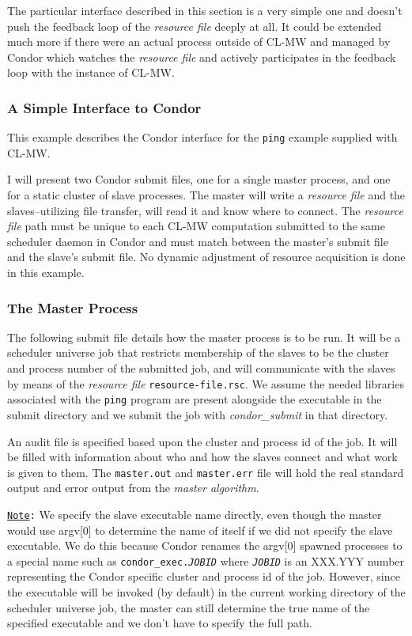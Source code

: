 \documentclass[titlepage,12pt]{book}
\newcommand{\xsmall}{\latexhtml{\small}{}}
\newcommand{\xnormalsize}{\latexhtml{\normalsize}{}}
\newcommand{\clmw}{\xsmall\textsc{CL-MW}\xnormalsize\xspace}
\newcommand{\ma}{\textit{master algorithm}\xspace}
\newcommand{\rfile}{\textit{resource file}\xspace}
\newcommand{\file}[1]{\texttt{#1}\xspace}
\newcommand{\Note}{\texttt{\underline{Note}:}\xspace}
\begin{document}
The particular interface described in this section is a very simple one
and doesn't push the feedback loop of the \rfile deeply at all. It
could be extended much more if there were an actual process outside
of \clmw and managed by Condor which watches the \rfile and actively
participates in the feedback loop with the instance of \clmw.

\subsubsection{A Simple Interface to Condor}

This example describes the Condor interface for the \texttt{ping}
example supplied with \clmw.

I will present two Condor submit files, one for a single master
process, and one for a static cluster of slave processes. The master
will write a \rfile and the slaves--utilizing file transfer, will
read it and know where to connect. The \rfile path must be unique
to each \clmw computation submitted to the same scheduler daemon
in Condor and must match between the master's submit file and the
slave's submit file. No dynamic adjustment of resource acquisition is
done in this example.

\subsubsection{The Master Process}

The following submit file details how the master process is to be run.
It will be a scheduler universe job that restricts membership of
the slaves to be the cluster and process number of the submitted
job, and will communicate with the slaves by means of the \rfile
\file{resource-file.rsc}. We assume the needed libraries associated
with the \texttt{ping} program are present alongside the executable in
the submit directory and we submit the job with \textit{condor\_submit}
in that directory.

An audit file is specified based upon the cluster and process id of
the job.  It will be filled with information about who and how the
slaves connect and what work is given to them. The \file{master.out}
and \file{master.err} file will hold the real standard output and
error output from the \ma.

\Note We specify the slave executable name directly, even though
the master would use argv[0] to determine the name of itself if we
did not specify the slave executable. We do this because Condor
renames the argv[0] spawned processes to a special name such as
\texttt{condor\_exec.\textit{JOBID}} where \texttt{\textit{JOBID}} is
an XXX.YYY number representing the Condor specific cluster and process
id of the job.  However, since the executable will be invoked (by
default) in the current working directory of the scheduler universe
job, the master can still determine the true name of the specified
executable and we don't have to specify the full path.
\end{document}
